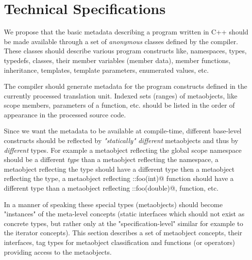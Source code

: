 \section{Technical Specifications}

We propose that the basic metadata describing a program written
in C++ should be made available through a set of {\em anonymous} classes
defined by the compiler. These classes should describe various program
constructs like, namespaces, types, typedefs, classes, their member variables
(member data), member functions, inheritance, templates, template parameters,
enumerated values, etc.

The compiler should generate metadata for the program constructs defined
in the currently processed translation unit. Indexed sets (ranges) of metaobjects,
like scope members, parameters of a function, etc. should be listed
in the order of appearance in the processed source code.

Since we want the metadata to be available at compile-time,
different base-level constructs should be reflected by
{\em "statically" different} metaobjects and thus by {\em different} types.
For example a metaobject reflecting the global scope namespace should
be a different {\em type} than a metaobject reflecting the \verb@std@
namespace, a metaobject reflecting the \verb@int@ type should
have a different type then a metaobject reflecting the \verb@double@
type, a metaobject reflecting \verb@::foo(int)@ function should
have a different type than a metaobject reflecting \verb@::foo(double)@,
function, etc.

In a manner of speaking these special types (metaobjects) should become
"instances" of the meta-level concepts (static interfaces which
should not exist as concrete types, but rather only at the
"specification-level" similar for example to the iterator concepts).
This section describes a set of metaobject concepts,
their interfaces, tag types for metaobject classification and
functions (or operators) providing access to the metaobjects.


%
%
